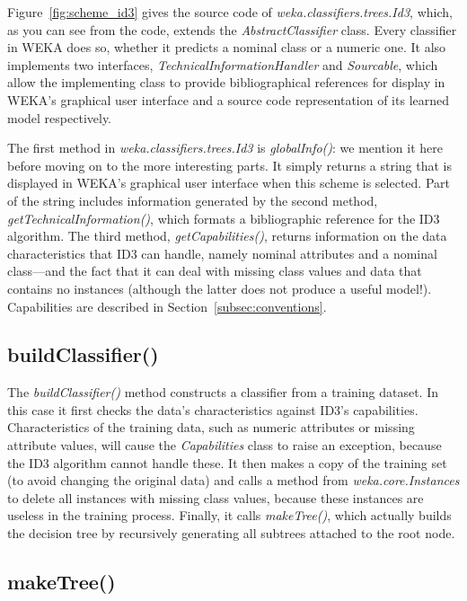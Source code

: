 Figure~\ref{fig:scheme_id3} gives the source code
of \textit{weka.classifiers.trees.Id3}, which, as you can see from the
code, extends the \textit{AbstractClassifier} class. Every classifier
in WEKA does so, whether it predicts a nominal class or a numeric
one. It also implements two
interfaces, \textit{TechnicalInformationHandler}
and \textit{Sourcable}, which allow the implementing class to provide
bibliographical references for display in WEKA's graphical user
interface and a source code representation of its learned model
respectively.

The first method in \textit{weka.classifiers.trees.Id3}
is \textit{globalInfo()}: we mention it here before moving on to the
more interesting parts. It simply returns a string that is displayed
in WEKA's graphical user interface when this scheme is selected. Part
of the string includes information generated by the second method,
\textit{getTechnicalInformation()}, which formats a bibliographic reference for
the ID3 algorithm. The third
method, \textit{getCapabilities()}, returns information on the data
characteristics that ID3 can handle, namely nominal
attributes and a nominal class---and the fact that it can deal with
missing class values and data that contains no instances (although the
latter does not produce a useful model!). Capabilities are described
in Section~\ref{subsec:conventions}.

\subsection{buildClassifier()}

The \textit{buildClassifier()} method constructs a classifier from a
training dataset. In this case it first checks the data's
characteristics against ID3's capabilities. Characteristics of the
training data, such as numeric attributes or missing attribute values,
will cause the \textit{Capabilities} class to raise an exception,
because the ID3 algorithm cannot handle these. It then makes a copy of
the training set (to avoid changing the original data) and calls a
method from {\em weka.core.Instances} to delete all instances with missing
class values, because these instances are useless in the training
process. Finally, it calls \textit{makeTree()}, which actually builds
the decision tree by recursively generating all subtrees attached to
the root node.

\subsection{makeTree()}

